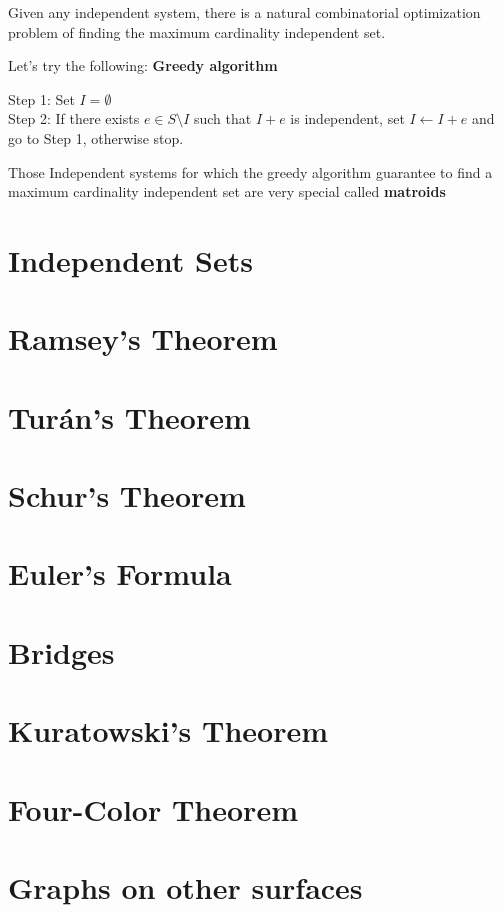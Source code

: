 			Given any independent system, there is a natural combinatorial optimization problem of finding the maximum cardinality independent set. 

			Let's try the following: \textbf{Greedy algorithm}

			Step 1: Set $I=\emptyset$\\
			Step 2: If there exists $e\in S \setminus I$ such that $I + e$ is independent, set $I \leftarrow I+e$ and go to Step 1, otherwise stop.

			Those Independent systems for which the greedy algorithm guarantee to find a maximum cardinality independent set are very special called \textbf{matroids}

		\section{Independent Sets}

		\section{Ramsey's Theorem}

		\section{Tur\'{a}n's Theorem}

		\section{Schur's Theorem}

		\section{Euler's Formula}

		\section{Bridges}

		\section{Kuratowski's Theorem}

		\section{Four-Color Theorem}

		\section{Graphs on other surfaces}

